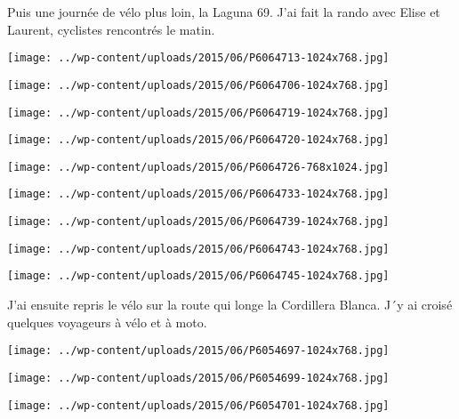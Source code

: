 \pagebreak
Puis une journée de vélo plus loin, la Laguna 69. J'ai fait la rando avec Elise et Laurent, cyclistes rencontrés le matin. 
\begin{center} \texttt{[image: ../wp-content/uploads/2015/06/P6064713-1024x768.jpg]} \end{center}
\begin{center} \texttt{[image: ../wp-content/uploads/2015/06/P6064706-1024x768.jpg]} \end{center}
\begin{center} \texttt{[image: ../wp-content/uploads/2015/06/P6064719-1024x768.jpg]} \end{center}
\begin{center} \texttt{[image: ../wp-content/uploads/2015/06/P6064720-1024x768.jpg]} \end{center}
\begin{center} \texttt{[image: ../wp-content/uploads/2015/06/P6064726-768x1024.jpg]} \end{center}
\begin{center} \texttt{[image: ../wp-content/uploads/2015/06/P6064733-1024x768.jpg]} \end{center}
\begin{center} \texttt{[image: ../wp-content/uploads/2015/06/P6064739-1024x768.jpg]} \end{center}
\begin{center} \texttt{[image: ../wp-content/uploads/2015/06/P6064743-1024x768.jpg]} \end{center}
\begin{center} \texttt{[image: ../wp-content/uploads/2015/06/P6064745-1024x768.jpg]} \end{center}

J'ai ensuite repris le vélo sur la route qui longe la Cordillera Blanca. J´y ai croisé quelques voyageurs à vélo et à moto. 
\begin{center} \texttt{[image: ../wp-content/uploads/2015/06/P6054697-1024x768.jpg]} \end{center}
\begin{center} \texttt{[image: ../wp-content/uploads/2015/06/P6054699-1024x768.jpg]} \end{center}
\begin{center} \texttt{[image: ../wp-content/uploads/2015/06/P6054701-1024x768.jpg]} \end{center}

